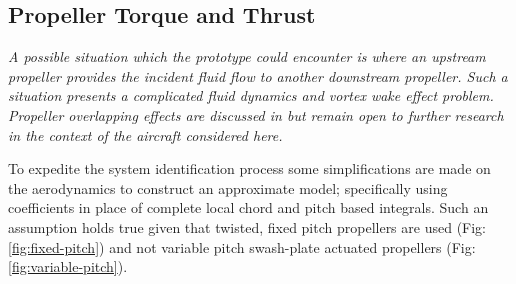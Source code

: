 \subsection{Propeller Torque and Thrust}
\label{subsec:dynamics.aero.bem}
\emph{\color{Gray} A possible situation which the prototype could encounter is where an upstream propeller provides the incident fluid flow to another downstream propeller. Such a situation presents a complicated fluid dynamics and vortex wake effect problem. Propeller overlapping effects are discussed in \cite{configurationpropulsion} but remain open to further research in the context of the aircraft considered here.}
\par
To expedite the system identification process some simplifications are made on the aerodynamics to construct an approximate model; specifically using coefficients in place of complete local chord and pitch based integrals. Such an assumption holds true given that twisted, fixed pitch propellers are used (Fig:\ref{fig:fixed-pitch}) and not variable pitch swash-plate actuated propellers (Fig:\ref{fig:variable-pitch}).
